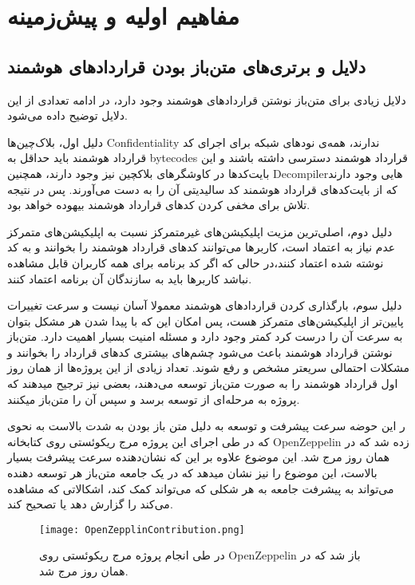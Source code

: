 \chapter{مفاهیم اولیه و پیش‌زمینه}
\section{دلایل و برتری‌های متن‌باز بودن قرارداد‌های هوشمند}
دلایل زیادی برای متن‌باز نوشتن قراردادهای هوشمند وجود دارد، در ادامه تعدادی از این دلایل توضیح داده می‌شود.

دلیل اول، بلاک‌چین‌ها
\gls{Confidentiality}
ندارند، همه‌ی نود‌های شبکه برای اجرای کد قرارداد هوشمند باید حداقل به
\glspl{bytecode}
قرارداد هوشمند دسترسی داشته باشند و این بایت‌کد‌ها در کاوشگرهای بلاکچین نیز وجود دارند، همچنین
\gls{Decompiler}هایی
وجود دارند که از بایت‌کد‌های قرارداد هوشمند کد سالیدیتی آن را به دست می‌آورند. پس در نتیجه تلاش برای مخفی کردن کدهای قرارداد هوشمند بیهوده خواهد بود.

دلیل دوم، اصلی‌ترین مزیت اپلیکیشن‌های غیرمتمرکز نسبت به اپلیکیشن‌های متمرکز عدم نیاز به اعتماد است، کاربرها می‌توانند کد‌های قرارداد هوشمند را بخوانند و به کد نوشته شده اعتماد کنند،‌در حالی که اگر کد برنامه برای همه کاربران قابل مشاهده نباشد کاربرها باید به سازندگان آن برنامه اعتماد کنند.

دلیل سوم، بارگذاری کردن قرارداد‌های هوشمند معمولا آسان نیست و سرعت تغییرات پایین‌تر از اپلیکیشن‌های متمرکز هست،‌ پس امکان این که با پیدا شدن هر مشکل بتوان به سرعت آن را درست کرد کمتر وجود دارد و مسئله امنیت بسیار اهمیت دارد. متن‌باز نوشتن قرارداد هوشمند باعث می‌شود چشم‌های بیشتری کدهای قرارداد را بخوانند و مشکلات احتمالی سریعتر مشخص و رفع شوند. تعداد زیادی از این پروژه‌ها از همان روز اول قرارداد هوشمند را به صورت متن‌باز توسعه می‌دهند، بعضی نیز ترجیح میدهند که پروژه به مرحله‌ای از توسعه برسد و سپس آن را متن‌باز میکنند.

ر این حوضه سرعت پیشرفت و توسعه به دلیل متن باز بودن به شدت بالاست به نحوی که در طی اجرای این پروژه مرج ریکوئستی روی کتابخانه OpenZeppelin زده شد که در همان روز مرج شد. این موضوع علاوه بر این که نشان‌دهنده سرعت پیشرفت بسیار بالاست، این موضوع را نیز نشان میدهد که در یک جامعه متن‌باز هر توسعه دهنده می‌تواند به پیشرفت جامعه به هر شکلی که می‌تواند کمک کند، اشکالاتی که مشاهده می‌کند را گزارش دهد یا تصحیح کند.

\begin{figure}[ht]
\centerline{\texttt{[image: OpenZepplinContribution.png]}}
\caption{در طی انجام پروژه مرج ریکوئستی روی OpenZeppelin باز شد که در همان روز مرج شد.}
\label{fig:zeppelin-merge-req}
\end{figure}


